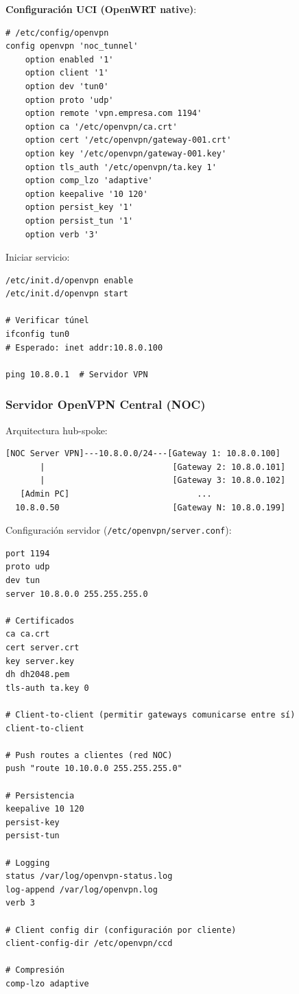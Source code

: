 \textbf{Configuración UCI (OpenWRT native)}:
\begin{verbatim}
# /etc/config/openvpn
config openvpn 'noc_tunnel'
    option enabled '1'
    option client '1'
    option dev 'tun0'
    option proto 'udp'
    option remote 'vpn.empresa.com 1194'
    option ca '/etc/openvpn/ca.crt'
    option cert '/etc/openvpn/gateway-001.crt'
    option key '/etc/openvpn/gateway-001.key'
    option tls_auth '/etc/openvpn/ta.key 1'
    option comp_lzo 'adaptive'
    option keepalive '10 120'
    option persist_key '1'
    option persist_tun '1'
    option verb '3'
\end{verbatim}

Iniciar servicio:
\begin{verbatim}
/etc/init.d/openvpn enable
/etc/init.d/openvpn start

# Verificar túnel
ifconfig tun0
# Esperado: inet addr:10.8.0.100

ping 10.8.0.1  # Servidor VPN
\end{verbatim}

\subsubsection{Servidor OpenVPN Central (NOC)}

Arquitectura hub-spoke:
\begin{verbatim}
[NOC Server VPN]---10.8.0.0/24---[Gateway 1: 10.8.0.100]
       |                          [Gateway 2: 10.8.0.101]
       |                          [Gateway 3: 10.8.0.102]
   [Admin PC]                          ...
  10.8.0.50                       [Gateway N: 10.8.0.199]
\end{verbatim}

Configuración servidor (\texttt{/etc/openvpn/server.conf}):
\begin{verbatim}
port 1194
proto udp
dev tun
server 10.8.0.0 255.255.255.0

# Certificados
ca ca.crt
cert server.crt
key server.key
dh dh2048.pem
tls-auth ta.key 0

# Client-to-client (permitir gateways comunicarse entre sí)
client-to-client

# Push routes a clientes (red NOC)
push "route 10.10.0.0 255.255.255.0"

# Persistencia
keepalive 10 120
persist-key
persist-tun

# Logging
status /var/log/openvpn-status.log
log-append /var/log/openvpn.log
verb 3

# Client config dir (configuración por cliente)
client-config-dir /etc/openvpn/ccd

# Compresión
comp-lzo adaptive
\end{verbatim}

